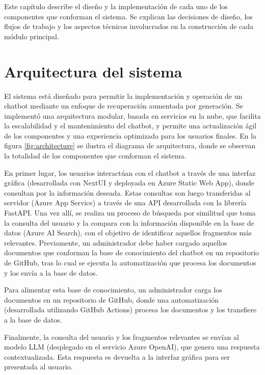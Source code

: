 
Este capítulo describe el diseño y la implementación de cada uno de los componentes que conforman el sistema.
Se explican las decisiones de diseño, los flujos de trabajo y los aspectos técnicos involucrados en la construcción de cada módulo principal.

\section{Arquitectura del sistema}

El sistema está diseñado para permitir la implementación y operación de un chatbot mediante un enfoque de recuperación aumentada por generación. 
Se implementó una arquitectura modular, basada en servicios en la nube, que facilita la escalabilidad y el mantenimiento del chatbot, y permite 
una actualización ágil de los componentes y una experiencia optimizada para los usuarios finales. En la figura \ref{fig:architecture} se ilustra
el diagrama de arquitectura, donde se observan la totalidad de los componentes que conforman el sistema.

En primer lugar, los usuarios interactúan con el chatbot a través de una interfaz gráfica (desarrollada con NextUI y deployada en Azure Static Web App), 
donde consultan por la información deseada. Estas consultas son luego transferidas al servidor (Azure App Service) a través de una API desarrollada 
con la librería FastAPI. Una vez allí, se realiza un proceso de búsqueda por similitud que toma la consulta del usuario y la compara con la información
disponible en la base de datos (Azure AI Search), con el objetivo de identificar aquellos fragmentos más relevantes. Previamente, un administrador
debe haber cargado aquellos documentos que conforman la base de conocimiento del chatbot en un repositorio de GitHub, tras lo cual se ejecuta la 
automatización que procesa los documentos y los envía a la base de datos.

Para alimentar esta base de conocimiento, un administrador carga los documentos en un repositorio de GitHub, donde una automatización (desarrollada 
utilizando GitHub Actions) procesa los documentos y los transfiere a la base de datos.

Finalmente, la consulta del usuario y los fragmentos relevantes se envían al modelo LLM (desplegado en el servicio Azure OpenAI), que genera una 
respuesta contextualizada. Esta respuesta es devuelta a la interfaz gráfica para ser presentada al usuario.

